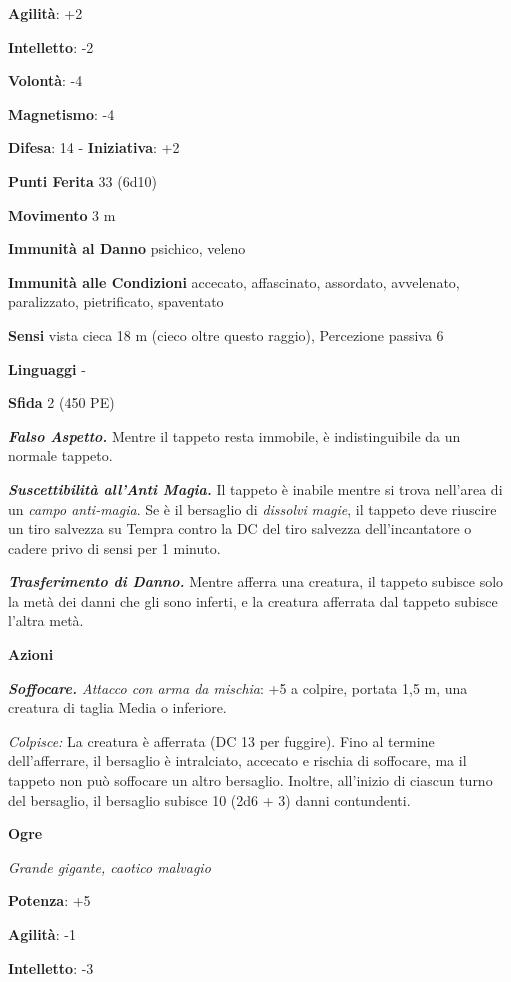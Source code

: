 \begin{multicols}{2}
\textbf{Agilità}: +2

\textbf{Intelletto}: -2

\textbf{Volontà}: -4

\textbf{Magnetismo}: -4

\textbf{Difesa}: 14 - \textbf{Iniziativa}: +2

\textbf{Punti Ferita} 33 (6d10)

\textbf{Movimento} 3 m

\textbf{Immunità al Danno} psichico, veleno

\textbf{Immunità alle Condizioni} accecato, affascinato, assordato,
avvelenato, paralizzato, pietrificato, spaventato

\textbf{Sensi} vista cieca 18 m (cieco oltre questo raggio), Percezione
passiva 6

\textbf{Linguaggi} -

\textbf{Sfida} 2 (450 PE)

\emph{\textbf{Falso Aspetto.}} Mentre il tappeto resta immobile, è
indistinguibile da un normale tappeto.

\emph{\textbf{Suscettibilità all'Anti Magia.}} Il tappeto è inabile
mentre si trova nell'area di un \emph{campo anti-magia}. Se è il
bersaglio di \emph{dissolvi} \emph{magie}, il tappeto deve riuscire un
tiro salvezza su Tempra contro la DC del tiro salvezza
dell'incantatore o cadere privo di sensi per 1 minuto.

\emph{\textbf{Trasferimento di Danno.}} Mentre afferra una creatura, il
tappeto subisce solo la metà dei danni che gli sono inferti, e la
creatura afferrata dal tappeto subisce l'altra metà.

\textbf{Azioni}

\emph{\textbf{Soffocare.} Attacco con arma da mischia}: +5 a colpire,
portata 1,5 m, una creatura di taglia Media o inferiore.

\emph{Colpisce:} La creatura è afferrata (DC 13 per fuggire). Fino al
termine dell'afferrare, il bersaglio è intralciato, accecato e rischia
di soffocare, ma il tappeto non può soffocare un altro bersaglio.
Inoltre, all'inizio di ciascun turno del bersaglio, il bersaglio subisce
10 (2d6 + 3) danni contundenti.

\textbf{Ogre}

\emph{Grande gigante, caotico malvagio}

\textbf{Potenza}: +5

\textbf{Agilità}: -1

\textbf{Intelletto}: -3


\end{multicols}
